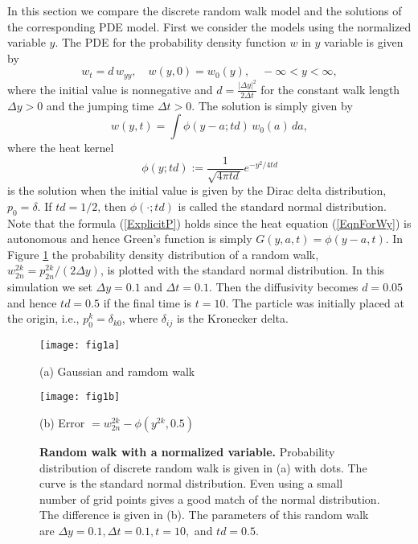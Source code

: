 \documentclass[11pt]{amsart}
\def\d{d}
\begin{document}
In this section we compare the discrete random walk model and the solutions of the corresponding PDE model. First we consider the models using the normalized variable $y$. The PDE for the probability density function $w$ in $y$ variable is given by
\begin{equation}\label{EqnForWy}
w_t=\d \,w_{yy},\quad w(y,0)=w_0(y),\quad -\infty<y<\infty,
\end{equation}
where the initial value is nonnegative and $\d=\frac{|\Delta y|^2}{2\Delta t}$ for the constant walk length $\Delta y>0$ and the jumping time $\Delta t>0$. The solution is simply given by
\begin{equation}\label{ExplicitP}
w(y,t) = \int \phi(y-a;t\d)\, w_0(a)\,da,
\end{equation}
where the heat kernel
\begin{equation*}
\phi(y;t\d):=\frac{1}{\sqrt{4\pi t\d\,}}e^{-y^2/4t\d}
\end{equation*}
is the solution when the initial value is given by the Dirac delta distribution, $p_0=\delta$. If $t\d=1/2$, then $\phi(\cdot;t\d)$ is called the standard normal distribution.  Note that the formula (\ref{ExplicitP}) holds since the heat equation (\ref{EqnForWy}) is autonomous and hence Green's function is simply $G(y,a,t)=\phi(y-a,t)$. In Figure \ref{fig1} the probability density distribution of a random walk, $w^{2k}_{2n}=p^{2k}_{2n}/(2\Delta y)$, is plotted with the standard normal distribution. In this simulation we set $\Delta y=0.1$ and $\Delta t=0.1$. Then the diffusivity becomes $\d=0.05$ and hence $t\d=0.5$ if the final time is $t=10$. The particle was initially placed at the origin, i.e., $p^k_0=\delta_{k0}$, where $\delta_{ij}$ is the Kronecker delta.

\begin{figure}[ht]
\centering
\begin{minipage}[t]{0.48\textwidth}
\centering
\texttt{[image: fig1a]}

(a) Gaussian and ramdom walk
\end{minipage}
\begin{minipage}[t]{0.48\textwidth}
 \centering
 \texttt{[image: fig1b]}

(b) Error $=w^{2k}_{2n}-\phi(y^{2k},0.5)$
\end{minipage}
 \caption{{\bf Random walk with a normalized variable.} Probability distribution of discrete random walk is given in (a) with dots. The curve is the standard normal distribution. Even using a small number of grid points gives a good match of the normal distribution. The difference is given in (b). The parameters of this random walk are $\Delta y=0.1,\Delta t=0.1,t=10,$ and $t\d=0.5$.} \label{fig1}
\end{figure}
\end{document}
